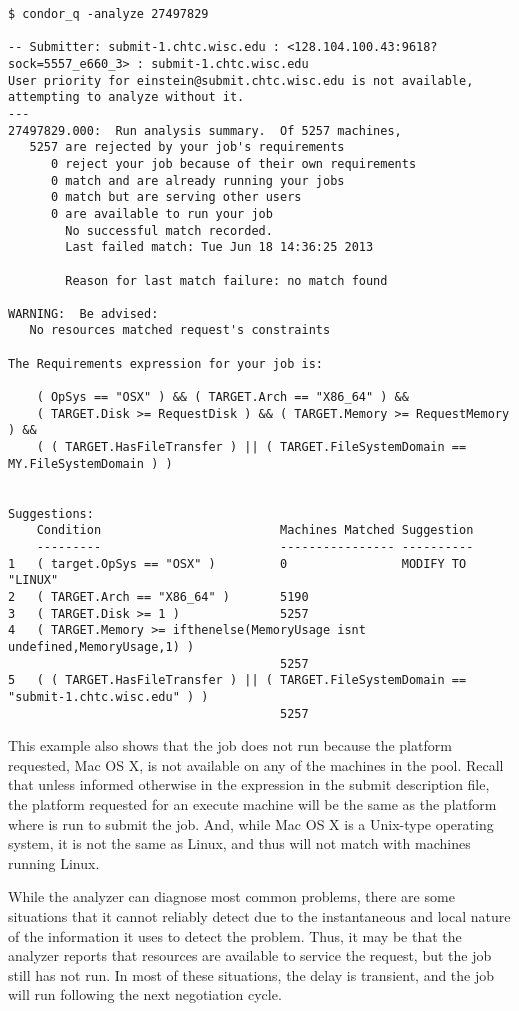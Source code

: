 \footnotesize
\begin{verbatim}
$ condor_q -analyze 27497829

-- Submitter: submit-1.chtc.wisc.edu : <128.104.100.43:9618?sock=5557_e660_3> : submit-1.chtc.wisc.edu
User priority for einstein@submit.chtc.wisc.edu is not available, attempting to analyze without it.
---
27497829.000:  Run analysis summary.  Of 5257 machines,
   5257 are rejected by your job's requirements
      0 reject your job because of their own requirements
      0 match and are already running your jobs
      0 match but are serving other users
      0 are available to run your job
        No successful match recorded.
        Last failed match: Tue Jun 18 14:36:25 2013

        Reason for last match failure: no match found

WARNING:  Be advised:
   No resources matched request's constraints

The Requirements expression for your job is:

    ( OpSys == "OSX" ) && ( TARGET.Arch == "X86_64" ) &&
    ( TARGET.Disk >= RequestDisk ) && ( TARGET.Memory >= RequestMemory ) &&
    ( ( TARGET.HasFileTransfer ) || ( TARGET.FileSystemDomain == MY.FileSystemDomain ) )


Suggestions:
    Condition                         Machines Matched Suggestion
    ---------                         ---------------- ----------
1   ( target.OpSys == "OSX" )         0                MODIFY TO "LINUX"
2   ( TARGET.Arch == "X86_64" )       5190
3   ( TARGET.Disk >= 1 )              5257
4   ( TARGET.Memory >= ifthenelse(MemoryUsage isnt undefined,MemoryUsage,1) )
                                      5257
5   ( ( TARGET.HasFileTransfer ) || ( TARGET.FileSystemDomain == "submit-1.chtc.wisc.edu" ) )
                                      5257 
\end{verbatim}
\normalsize

This example also shows that the job does not run because the 
platform requested, Mac OS X, is not available on any of the 
machines in the pool.
Recall that unless informed otherwise in the 
expression in the submit description file,
the platform requested for an execute machine will be the same
as the platform where  is run to submit the job.
And, while Mac OS X is a Unix-type operating system, it is
not the same as Linux, and thus will not match with machines
running Linux.

While the analyzer can diagnose most common problems, there are some situations
that it cannot reliably detect due to the instantaneous and local nature of the
information it uses to detect the problem.  Thus, it may be that the analyzer
reports that resources are available to service the request, but the job still 
has not run.  In most of these situations, the delay is transient, and the
job will run following the next negotiation cycle.

